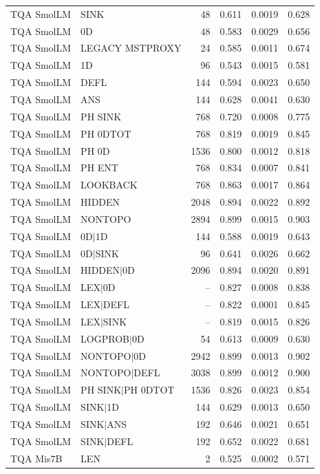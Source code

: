 \begin{longtable}{llrrrr}
TQA SmolLM & SINK & 48 & 0.611 & 0.0019 & 0.628 \\
TQA SmolLM & 0D & 48 & 0.583 & 0.0029 & 0.656 \\
TQA SmolLM & LEGACY MSTPROXY & 24 & 0.585 & 0.0011 & 0.674 \\
TQA SmolLM & 1D & 96 & 0.543 & 0.0015 & 0.581 \\
TQA SmolLM & DEFL & 144 & 0.594 & 0.0023 & 0.650 \\
TQA SmolLM & ANS & 144 & 0.628 & 0.0041 & 0.630 \\
TQA SmolLM & PH SINK & 768 & 0.720 & 0.0008 & 0.775 \\
TQA SmolLM & PH 0DTOT & 768 & 0.819 & 0.0019 & 0.845 \\
TQA SmolLM & PH 0D & 1536 & 0.800 & 0.0012 & 0.818 \\
TQA SmolLM & PH ENT & 768 & 0.834 & 0.0007 & 0.841 \\
TQA SmolLM & LOOKBACK & 768 & 0.863 & 0.0017 & 0.864 \\
TQA SmolLM & HIDDEN & 2048 & 0.894 & 0.0022 & 0.892 \\
TQA SmolLM & NONTOPO & 2894 & 0.899 & 0.0015 & 0.903 \\
TQA SmolLM & 0D$\mid$1D & 144 & 0.588 & 0.0019 & 0.643 \\
TQA SmolLM & 0D$\mid$SINK & 96 & 0.641 & 0.0026 & 0.662 \\
TQA SmolLM & HIDDEN$\mid$0D & 2096 & 0.894 & 0.0020 & 0.891 \\
TQA SmolLM & LEX$\mid$0D & -- & 0.827 & 0.0008 & 0.838 \\
TQA SmolLM & LEX$\mid$DEFL & -- & 0.822 & 0.0001 & 0.845 \\
TQA SmolLM & LEX$\mid$SINK & -- & 0.819 & 0.0015 & 0.826 \\
TQA SmolLM & LOGPROB$\mid$0D & 54 & 0.613 & 0.0009 & 0.630 \\
TQA SmolLM & NONTOPO$\mid$0D & 2942 & 0.899 & 0.0013 & 0.902 \\
TQA SmolLM & NONTOPO$\mid$DEFL & 3038 & 0.899 & 0.0012 & 0.900 \\
TQA SmolLM & PH SINK$\mid$PH 0DTOT & 1536 & 0.826 & 0.0023 & 0.854 \\
TQA SmolLM & SINK$\mid$1D & 144 & 0.629 & 0.0013 & 0.650 \\
TQA SmolLM & SINK$\mid$ANS & 192 & 0.646 & 0.0021 & 0.651 \\
TQA SmolLM & SINK$\mid$DEFL & 192 & 0.652 & 0.0022 & 0.681 \\
TQA Mis7B & LEN & 2 & 0.525 & 0.0002 & 0.571 \\

\end{longtable}
